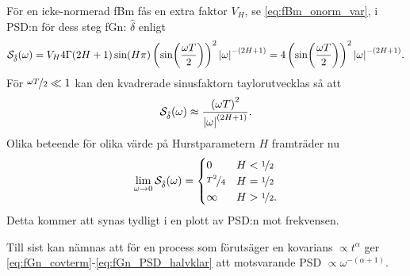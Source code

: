 För en icke-normerad fBm fås en extra faktor $V_H$, se \eqref{eq:fBm_onorm_var}, i PSD:n för dess steg fGn: $\hat{\delta}$ enligt
\begin{equation} \label{eq:fGn_PSD}
\mathcal{S}_{\hat{\delta}}(\omega) 
= V_H 4\Gamma{(2H+1)}\sin(H\pi) \left( \sin(\frac{\omega T}{2}) \right)^2 \abs{\omega}^{-(2H+1)} 
= 4 \left( \sin(\frac{\omega T}{2}) \right) ^2\abs{\omega}^{-(2H+1)}.
\end{equation}
För $\nicefrac{\omega T}{2} \ll 1$ kan den kvadrerade sinusfaktorn taylorutvecklas så att
\begin{equation}
    \mathcal{S}_{\hat{\delta}}(\omega) \approx \frac{ \left( \omega T \right)^2}{\abs{\omega}^{(2H+1)}}.
\end{equation}
Olika beteende för olika värde på Hurstparametern $H$ framträder nu 
\begin{equation}
    \lim\limits_{\omega \to 0} \mathcal{S}_{\hat{\delta}}(\omega) = \begin{cases} 
      0 & H<\nicefrac{1}{2} \\
      \nicefrac{T^2}{4} & H=\nicefrac{1}{2} \\
      \infty & H>\nicefrac{1}{2}.
   \end{cases}
\end{equation}
Detta kommer att synas tydligt i en plott av PSD:n mot frekvensen.

Till sist kan nämnas att för en process som förutsäger en kovarians $\propto t^{\alpha}$ ger \eqref{eq:fGn_covterm}-\eqref{eq:fGn_PSD_halvklar} att motsvarande PSD $\propto \omega^{-(\alpha+1)}$.





